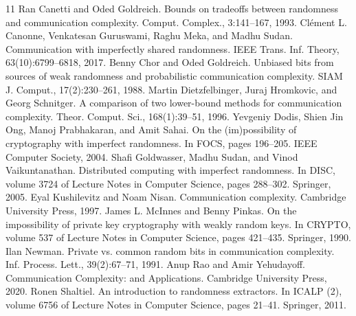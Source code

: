 \documentclass[10pt,a4paper]{article}
\begin{document}
\begin{thebibliography}{11}
 Ran Canetti and Oded Goldreich. Bounds on tradeoffs between randomness and communication complexity. Comput. Complex., 3:141--167, 1993.
 Clément L. Canonne, Venkatesan Guruswami, Raghu Meka, and Madhu Sudan. Communication with imperfectly shared randomness. IEEE Trans. Inf. Theory, 63(10):6799--6818, 2017.
 Benny Chor and Oded Goldreich. Unbiased bits from sources of weak randomness and probabilistic communication complexity. SIAM J. Comput., 17(2):230--261, 1988.
 Martin Dietzfelbinger, Juraj Hromkovic, and Georg Schnitger. A comparison of two lower-bound methods for communication complexity. Theor. Comput. Sci., 168(1):39--51, 1996.
 Yevgeniy Dodis, Shien Jin Ong, Manoj Prabhakaran, and Amit Sahai. On the (im)possibility of cryptography with imperfect randomness. In FOCS, pages 196--205. IEEE Computer Society, 2004.
 Shafi Goldwasser, Madhu Sudan, and Vinod Vaikuntanathan. Distributed computing with imperfect randomness. In DISC, volume 3724 of Lecture Notes in Computer Science, pages 288--302. Springer, 2005.
 Eyal Kushilevitz and Noam Nisan. Communication complexity. Cambridge University Press, 1997.
 James L. McInnes and Benny Pinkas. On the impossibility of private key cryptography with weakly random keys. In CRYPTO, volume 537 of Lecture Notes in Computer Science, pages 421--435. Springer, 1990.
 Ilan Newman. Private vs. common random bits in communication complexity. Inf. Process. Lett., 39(2):67--71, 1991.
 Anup Rao and Amir Yehudayoff. Communication Complexity: and Applications. Cambridge University Press, 2020.
 Ronen Shaltiel. An introduction to randomness extractors. In ICALP (2), volume 6756 of Lecture Notes in Computer Science, pages 21--41. Springer, 2011.
\end{thebibliography}
\end{document}
